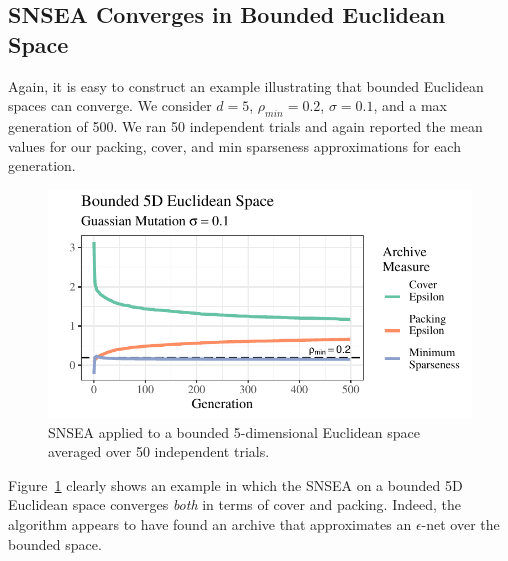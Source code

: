 \documentclass[twoside]{article}
\begin{document}
\subsection{SNSEA Converges in Bounded Euclidean Space}
\label{subsec:bounded}
Again, it is easy to construct an example illustrating that bounded Euclidean spaces can converge.  We consider $d=5$, $\rho_{min} = 0.2$, $\sigma=0.1$, and a max generation of 500.  We ran 50 independent trials and again reported the mean values for our packing, cover, and min sparseness approximations for each generation.  
\begin{figure}[t]
\includegraphics[width=1\textwidth]{Figures/bounded-s01-r03-NOPOP.pdf}
\caption{\label{fig:bounded:nopop:0103} SNSEA applied to a bounded 5-dimensional Euclidean space averaged over 50 independent trials.}
\end{figure}
%
Figure~\ref{fig:bounded:nopop:0103} clearly shows an example in which the SNSEA on a bounded 5D Euclidean space converges \emph{both} in terms of cover and packing.  Indeed, the algorithm appears to have found an archive that approximates an $\epsilon$-net over the bounded space.  
\end{document}
